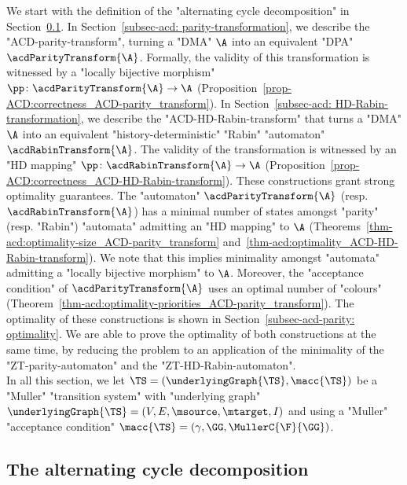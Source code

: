 \documentclass[10pt,a4paper]{amsart}
\renewcommand{\gg}{\gamma}
\begin{document}
We start with the definition of the "alternating cycle decomposition" in Section~\ref{subsec-acd: acd-definition}. In Section~\ref{subsec-acd: parity-transformation}, we describe the "ACD-parity-transform", turning a "DMA" $\A$ into an equivalent "DPA" $\acdParityTransform{\A}$. Formally, the validity of this transformation is witnessed by a "locally bijective morphism" $\pp\colon \acdParityTransform{\A}\to \A$ (Proposition~\ref{prop-ACD:correctness_ACD-parity_transform}).
In Section~\ref{subsec-acd: HD-Rabin-transformation}, we describe the "ACD-HD-Rabin-transform" that turns a "DMA" $\A$ into an equivalent "history-deterministic" "Rabin" "automaton" $\acdRabinTransform{\A}$. The validity of the transformation is witnessed by an "HD mapping" $\pp\colon \acdRabinTransform{\A}\to \A$ (Proposition~\ref{prop-ACD:correctness_ACD-HD-Rabin-transform}).
These constructions grant strong optimality guarantees. The "automaton" $\acdParityTransform{\A}$ (resp. $\acdRabinTransform{\A}$) has a minimal number of states amongst "parity" (resp. "Rabin") "automata" admitting an "HD mapping" to $\A$ (Theorems~\ref{thm-acd:optimality-size_ACD-parity_transform} and~\ref{thm-acd:optimality_ACD-HD-Rabin-transform}). We note that this implies minimality amongst "automata" admitting a "locally bijective morphism" to $\A$.
Moreover, the "acceptance condition" of $\acdParityTransform{\A}$ uses an optimal number of "colours" (Theorem~\ref{thm-acd:optimality-priorities_ACD-parity_transform}).
The optimality of these constructions is shown in Section~\ref{subsec-acd-parity: optimality}. We are able to prove the optimality of both constructions at the same time, by reducing the problem to an application of the minimality of the "ZT-parity-automaton" and the "ZT-HD-Rabin-automaton".\\


In all this section, we let $\TS = (\underlyingGraph{\TS}, \macc{\TS})$ be a "Muller" "transition system" with "underlying graph"  $\underlyingGraph{\TS} =(V ,E , \msource , \mtarget, I)$ and using a "Muller" "acceptance condition" $\macc{\TS} = (\gg, \GG, \MullerC{\F}{\GG})$.

\subsection{The alternating cycle decomposition}\label{subsec-acd: acd-definition}
\end{document}
